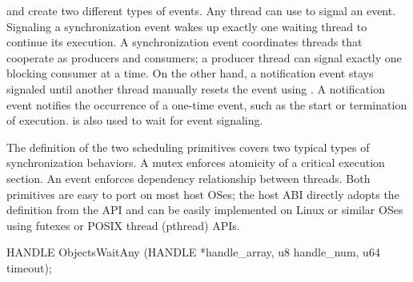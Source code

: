  and  create two different types of events.
Any thread can use  to signal an event.
Signaling a synchronization event wakes up exactly one waiting thread to continue its execution.
A synchronization event coordinates threads that cooperate as producers and consumers;
a producer thread can signal exactly one blocking consumer at a time.
On the other hand, a notification event stays signaled until another thread
manually resets the event using .
A notification event notifies the occurrence of a one-time event,
such as the start or termination of execution.
is also used
to wait for event signaling.



The definition of the two scheduling primitives
covers two typical types of synchronization behaviors.
A mutex enforces atomicity of a critical
execution section.
An event enforces dependency relationship between
threads.
Both primitives are easy to port on most host OSes;
the host ABI directly adopts the definition from the \win{} API and can be easily implemented
on Linux or similar OSes using futexes or POSIX thread (pthread) APIs. 







\begin{paldef}
HANDLE ObjectsWaitAny (HANDLE *handle_array,
                       u8 handle_num, u64 timeout);
\end{paldef}


